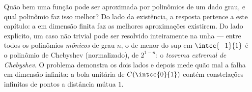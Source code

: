 Quão bem uma função pode ser aproximada por polinômios de um dado
grau, e qual polinômio faz isso melhor? Do lado da existência,
a resposta pertence a este capítulo: a  em dimensão
finita faz as melhores aproximações existirem. Do lado explícito,
um caso não trivial pode ser resolvido inteiramente na unha ---
entre todos os polinômios \emph{mônicos} de grau $n$, o de
menor  do sup em $\intcc{-1}{1}$ é o polinômio de Chebyshev
(normalizado), de  $2^{1-n}$: o \emph{teorema extremal de
Chebyshev}. O problema demonstra os dois lados e depois mede quão mal
a  falha em dimensão infinita: a bola unitária de
$C(\intcc{0}{1})$ contém constelações infinitas de pontos a
distância mútua $1$.

